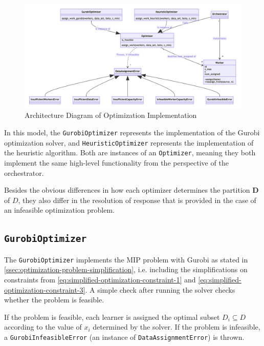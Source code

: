 \documentclass[../mthe-493-final-project.tex]{subfiles}
\begin{document}
    \begin{figure}
        \centering
        \includegraphics{thesis/img/data_assignment.png}
        \caption{Architecture Diagram of Optimization Implementation}
        \label{fig:optimization-architecture}
    \end{figure}
    
    In this model, the \texttt{GurobiOptimizer} represents the implementation of the Gurobi optimization solver, and \texttt{HeuristicOptimizer} represents the implementation of the heuristic algorithm. Both are instances of an \texttt{Optimizer}, meaning they both implement the same high-level functionality from the perspective of the orchestrator.
    
    Besides the obvious differences in how each optimizer determines the partition $\boldsymbol{D}$ of $D$, they also differ in the resolution of response that is provided in the case of an infeasible optimization problem.
    
    \subsection{\texttt{GurobiOptimizer}}
    \label{ssec:optimization-gurobi-optimizer-implementation}
    
    The \texttt{GurobiOptimizer} implements the MIP problem with Gurobi as stated in \autoref{ssec:optimization-problem-simplification}, i.e. including the simplifications on constraints from \eqref{eq:simplified-optimization-constraint-1} and \eqref{eq:simplified-optimization-constraint-3}. A simple check after running the solver checks whether the problem is feasible.
    
    If the problem is feasible, each learner is assigned the optimal subset $D_i \subseteq D$ according to the value of $x_i$ determined by the solver. If the problem is infeasible, a \texttt{GurobiInfeasibleError} (an instance of \texttt{DataAssignmentError}) is thrown.
    
\end{document}
